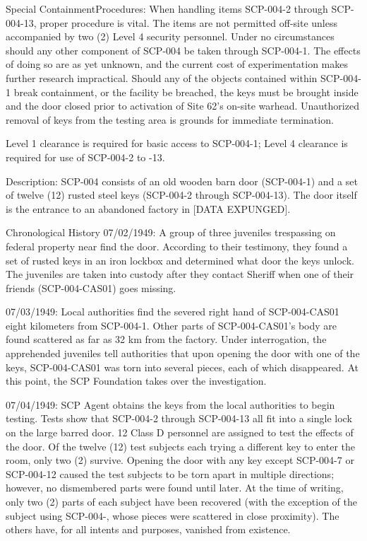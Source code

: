 \documentclass[a4paper, 11pt]{article}
\newcommand{\lb}{\ensuremath{[}}
\newcommand{\rb}{\ensuremath{]}}
\newcommand{\expunged}{\lb DATA EXPUNGED\rb}
\begin{document}
Special Containment\linebreak Procedures: When handling items SCP-004-2 through SCP-004-13, proper procedure is vital. The items are not permitted off-site unless accompanied by two (2) Level 4 security personnel. Under no circumstances should any other component of SCP-004 be taken through SCP-004-1. The effects of doing so are as yet unknown, and the current cost of experimentation makes further research impractical. Should any of the objects contained within SCP-004-1 break containment, or the facility be breached, the keys must be brought inside and the door closed prior to activation of Site 62’s on-site warhead. Unauthorized removal of keys from the testing area is grounds for immediate termination.

Level 1 clearance is required for basic access to SCP-004-1; Level 4 clearance is required for use of SCP-004-2 to -13.

Description: SCP-004 consists of an old wooden barn door (SCP-004-1) and a set of twelve (12) rusted steel keys (SCP-004-2 through SCP-004-13). The door itself is the entrance to an abandoned factory in \expunged.

Chronological History
07/02/1949: A group of three juveniles trespassing on federal property near  find the door. According to their testimony, they found a set of rusted keys in an iron lockbox and determined what door the keys unlock. The juveniles are taken into custody after they contact Sheriff  when one of their friends (SCP-004-CAS01) goes missing.

07/03/1949: Local authorities find the severed right hand of SCP-004-CAS01 eight kilometers from SCP-004-1. Other parts of SCP-004-CAS01's body are found scattered as far as 32 km from the factory. Under interrogation, the apprehended juveniles tell authorities that upon opening the door with one of the keys, SCP-004-CAS01 was torn into several pieces, each of which disappeared. At this point, the SCP Foundation takes over the investigation.

07/04/1949: SCP Agent  obtains the keys from the local authorities to begin testing. Tests show that SCP-004-2 through SCP-004-13 all fit into a single lock on the large barred door. 12 Class D personnel are assigned to test the effects of the door. Of the twelve (12) test subjects each trying a different key to enter the room, only two (2) survive. Opening the door with any key except SCP-004-7 or SCP-004-12 caused the test subjects to be torn apart in multiple directions; however, no dismembered parts were found until later. At the time of writing, only two (2) parts of each subject have been recovered (with the exception of the subject using SCP-004-, whose pieces were scattered in close proximity). The others have, for all intents and purposes, vanished from existence.
\end{document}
